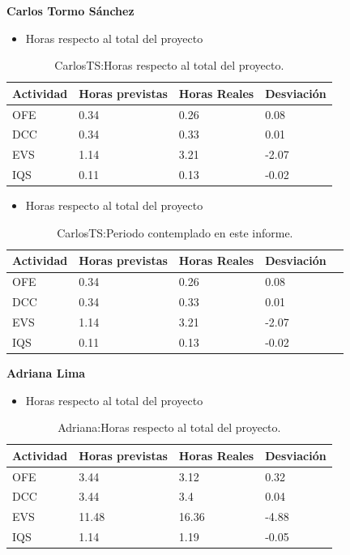 \textbf{Carlos Tormo Sánchez}
\begin{itemize}
\item Horas respecto al total del proyecto
\end{itemize}
\begin{table}[H]
\begin{center}
\begin{tabular}{ l l l l }
Actividad & Horas previstas & Horas Reales & Desviación \\ \hline \hline
	OFE & 0.34 & 0.26 & 0.08 \\ \hline
	DCC & 0.34 & 0.33 & 0.01 \\ \hline
	EVS & 1.14 & 3.21 & -2.07\\ \hline
	IQS & 0.11 & 0.13 & -0.02 \\ \hline
\end{tabular}
\caption{CarlosTS:Horas respecto al total del proyecto.}
\label{tab:CarlosTS:HorasTotalInforme}
\end{center}
\end{table}

\begin{itemize}
\item Horas respecto al total del proyecto
\end{itemize}
\begin{table}[H]
\begin{center}
\begin{tabular}{ l l l l l }
  Actividad & Horas previstas & Horas Reales & Desviación \\ \hline \hline
  	OFE & 0.34 & 0.26 & 0.08 \\ \hline
  	DCC & 0.34 & 0.33 & 0.01 \\ \hline
  	EVS & 1.14 & 3.21 & -2.07\\ \hline
  	IQS & 0.11 & 0.13 & -0.02 \\ \hline
\end{tabular}
\caption{CarlosTS:Periodo contemplado en este informe.}
\label{tab:CarlosTS:PeriodoContempladoInforme}
\end{center}
\end{table}

\textbf{Adriana Lima}
\begin{itemize}
\item Horas respecto al total del proyecto
\end{itemize}
\begin{table}[H]
\begin{center}
\begin{tabular}{ l l l l }
	Actividad & Horas previstas & Horas Reales & Desviación \\ \hline \hline
  	OFE & 3.44 & 3.12 & 0.32 \\ \hline
  	DCC & 3.44 & 3.4 & 0.04 \\ \hline
  	EVS & 11.48 & 16.36 & -4.88 \\ \hline
  	IQS & 1.14 & 1.19 & -0.05 \\ \hline
\end{tabular}
\caption{Adriana:Horas respecto al total del proyecto.}
\label{tab:Adriana:HorasTotalInforme}
\end{center}
\end{table}

